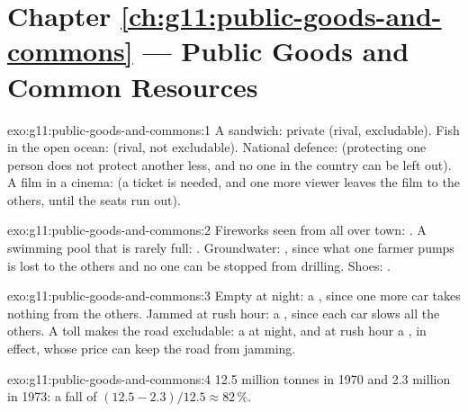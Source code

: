\section*{Chapter \ref{ch:g11:public-goods-and-commons} --- Public Goods and Common Resources}

\begin{solution}{exo:g11:public-goods-and-commons:1}
A sandwich: private (rival, excludable). Fish in the open ocean:  (rival, not excludable). National defence:  (protecting one person does not
protect another less, and no one in the country can be left out). A film in a cinema:  (a ticket is needed, and one more viewer leaves the film to the others,
until the seats run out).
\end{solution}

\begin{solution}{exo:g11:public-goods-and-commons:2}
Fireworks seen from all over town: . A swimming pool that is rarely full: . Groundwater: , since what one farmer pumps is lost to the
others and no one can be stopped from drilling. Shoes: .
\end{solution}

\begin{solution}{exo:g11:public-goods-and-commons:3}
Empty at night: a , since one more car takes nothing from the others. Jammed at rush hour: a , since each car slows all the others. A toll makes
the road excludable: a  at night, and at rush hour a , in effect, whose price can keep the road from jamming.
\end{solution}

\begin{solution}{exo:g11:public-goods-and-commons:4}
12.5 million tonnes in 1970 and 2.3 million in 1973: a fall of $(12.5 - 2.3)/12.5 \approx 82\,\%$.
\end{solution}

